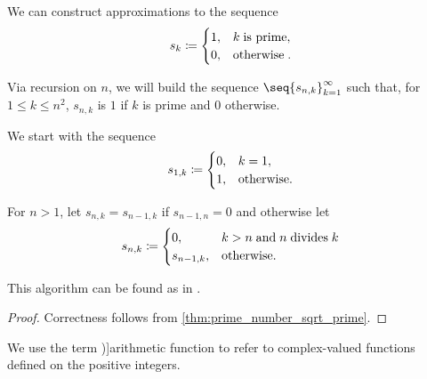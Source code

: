 \begin{algorithm}\label{alg:sieve_of_eratosthenes}
  We can construct approximations to the sequence
  \begin{equation*}
    s_k \coloneqq \begin{cases}
      1, &k \T{is prime}, \\
      0, &\T{otherwise}.
    \end{cases}
  \end{equation*}

  Via recursion on \( n \), we will build the sequence \( \seq{ s_{n,k} }_{k=1}^\infty \) such that, for \( 1 \leq k \leq n^2 \), \( s_{n,k} \) is \( 1 \) if \( k \) is prime and \( 0 \) otherwise.

  \begin{thmenum}
     We start with the sequence
    \begin{equation*}
      s_{1,k} \coloneqq \begin{cases}
        0, &k = 1, \\
        1, &\T{otherwise.}
      \end{cases}
    \end{equation*}

     For \( n > 1 \), let \( s_{n,k} = s_{n-1,k} \) if \( s_{n-1,n} = 0 \) and otherwise let
    \begin{equation*}
      s_{n,k} \coloneqq \begin{cases}
        0,         &k > n \T{and} n \T{divides} k \\
        s_{n-1,k}, &\T{otherwise.}
      \end{cases}
    \end{equation*}
  \end{thmenum}
\end{algorithm}
\begin{comments}
  \item This algorithm can be found as  in \cite{notebook:code}.
\end{comments}
\begin{proof}
  Correctness follows from \cref{thm:prime_number_sqrt_prime}.
\end{proof}

\begin{definition}\label{def:arithmetic_function}
  We use the term \term[en=arithmetical function (\cite[24]{Apostol1976AnalyticNumberTheory})]{arithmetic function} to refer to complex-valued functions defined on the positive integers.
\end{definition}

